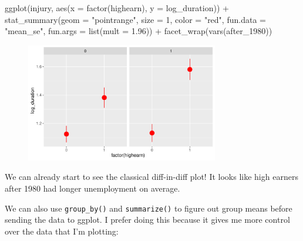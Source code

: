 \documentclass[
  letterpaper,
  DIV=11,
  numbers=noendperiod]{scrartcl}
\newenvironment{Shaded}{\begin{snugshade}}{\end{snugshade}}
\newcommand{\AttributeTok}[1]{\textcolor[rgb]{0.40,0.45,0.13}{#1}}
\newcommand{\DecValTok}[1]{\textcolor[rgb]{0.68,0.00,0.00}{#1}}
\newcommand{\FloatTok}[1]{\textcolor[rgb]{0.68,0.00,0.00}{#1}}
\newcommand{\FunctionTok}[1]{\textcolor[rgb]{0.28,0.35,0.67}{#1}}
\newcommand{\NormalTok}[1]{\textcolor[rgb]{0.00,0.23,0.31}{#1}}
\newcommand{\SpecialCharTok}[1]{\textcolor[rgb]{0.37,0.37,0.37}{#1}}
\newcommand{\StringTok}[1]{\textcolor[rgb]{0.13,0.47,0.30}{#1}}
\begin{document}
\begin{Shaded}
\begin{Highlighting}[]
\FunctionTok{ggplot}\NormalTok{(injury, }\FunctionTok{aes}\NormalTok{(}\AttributeTok{x =} \FunctionTok{factor}\NormalTok{(highearn), }\AttributeTok{y =}\NormalTok{ log\_duration)) }\SpecialCharTok{+}
  \FunctionTok{stat\_summary}\NormalTok{(}\AttributeTok{geom =} \StringTok{"pointrange"}\NormalTok{, }\AttributeTok{size =} \DecValTok{1}\NormalTok{, }\AttributeTok{color =} \StringTok{"red"}\NormalTok{,}
               \AttributeTok{fun.data =} \StringTok{"mean\_se"}\NormalTok{, }\AttributeTok{fun.args =} \FunctionTok{list}\NormalTok{(}\AttributeTok{mult =} \FloatTok{1.96}\NormalTok{)) }\SpecialCharTok{+}
  \FunctionTok{facet\_wrap}\NormalTok{(}\FunctionTok{vars}\NormalTok{(after\_1980))}
\end{Highlighting}
\end{Shaded}

\begin{figure}[H]

{\centering \includegraphics[width=0.75\textwidth,height=\textheight]{DD_wooldridge_injury_files/figure-pdf/plot-means-with-pointrange-1.pdf}

}

\end{figure}

We can already start to see the classical diff-in-diff plot! It looks
like high earners after 1980 had longer unemployment on average.

We can also use \texttt{group\_by()} and \texttt{summarize()} to figure
out group means before sending the data to ggplot. I prefer doing this
because it gives me more control over the data that I'm plotting:
\end{document}
